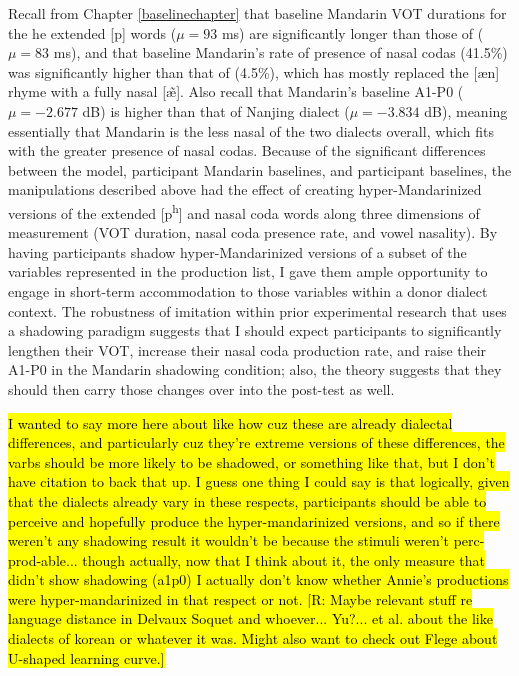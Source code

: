     Recall from Chapter \ref{baselinechapter} that baseline Mandarin VOT durations for the he extended [p] words ($\mu = 93$ ms) are significantly longer than those of \ND{} ($\mu = 83$ ms), and that baseline Mandarin's rate of presence of nasal codas (41.5\%) was significantly higher than that of \ND{} (4.5\%), which has mostly replaced the [\ae n] rhyme with a fully nasal [\~{\ae}]. Also recall that Mandarin's baseline A1-P0 ($\mu = -2.677$ dB) is higher than that of Nanjing dialect ($\mu = -3.834$ dB), meaning essentially that Mandarin is the less nasal of the two dialects overall, which fits with the greater presence of nasal codas. Because of the significant differences between the model, participant Mandarin baselines, and participant \ND{} baselines, the manipulations described above had the effect of creating hyper-Mandarinized versions of the extended [p\textsuperscript{h}] and nasal coda words along three dimensions of measurement (VOT duration, nasal coda presence rate, and vowel nasality). By having participants shadow hyper-Mandarinized versions of a subset of the variables represented in the production list, I gave them ample opportunity to engage in short-term accommodation to those variables within a donor dialect context. The robustness of imitation within prior experimental research that uses a shadowing paradigm suggests that I should expect participants to significantly lengthen their VOT, increase their nasal coda production rate, and raise their A1-P0 in the Mandarin shadowing condition; also, the theory suggests that they should then carry those changes over into the \ND{} post-test as well.

    \hl{I wanted to say more here about like how cuz these are already dialectal differences, and particularly cuz they're extreme versions of these differences, the varbs should be more likely to be shadowed, or something like that, but I don't have citation to back that up. I guess one thing I could say is that logically, given that the dialects already vary in these respects, participants should be able to perceive and hopefully produce the hyper-mandarinized versions, and so if there weren't any shadowing result it wouldn't be because the stimuli weren't perc-prod-able... though actually, now that I think about it, the only measure that didn't show shadowing (a1p0) I actually don't know whether Annie's productions were hyper-mandarinized in that respect or not. [R: Maybe relevant stuff re language distance in Delvaux Soquet and whoever... Yu?... et al. about the like dialects of korean or whatever it was. Might also want to check out Flege about U-shaped learning curve.]}
     
